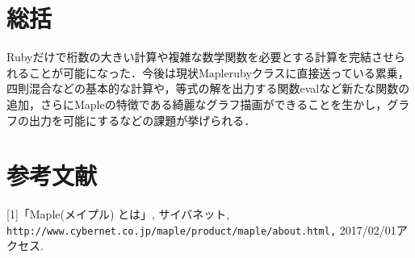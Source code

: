 \documentclass[10pt,a4j,twocolumn]{jsarticle}
\begin{document}
\section{総括}
Rubyだけで桁数の大きい計算や複雑な数学関数を必要とする計算を完結させられることが可能になった．今後は現状Maplerubyクラスに直接送っている累乗，四則混合などの基本的な計算や，等式の解を出力する関数evalなど新たな関数の追加，さらにMapleの特徴である綺麗なグラフ描画ができることを生かし，グラフの出力を可能にするなどの課題が挙げられる．

\section{参考文献}
[1]「Maple(メイプル) とは」, サイバネット, \verb|http://www.cybernet.co.jp/maple/product/maple/about.html,| 2017/02/01アクセス.
\end{document}

